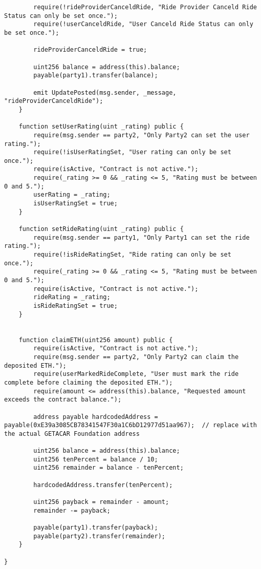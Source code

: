\begin{lstlisting}
        require(!rideProviderCanceldRide, "Ride Provider Canceld Ride Status can only be set once.");
        require(!userCanceldRide, "User Canceld Ride Status can only be set once.");

        rideProviderCanceldRide = true;

        uint256 balance = address(this).balance;
        payable(party1).transfer(balance);
        
        emit UpdatePosted(msg.sender, _message, "rideProviderCanceldRide");
    }

    function setUserRating(uint _rating) public {
        require(msg.sender == party2, "Only Party2 can set the user rating.");
        require(!isUserRatingSet, "User rating can only be set once.");
        require(isActive, "Contract is not active.");
        require(_rating >= 0 && _rating <= 5, "Rating must be between 0 and 5.");
        userRating = _rating;
        isUserRatingSet = true;
    }

    function setRideRating(uint _rating) public {
        require(msg.sender == party1, "Only Party1 can set the ride rating.");
        require(!isRideRatingSet, "Ride rating can only be set once.");
        require(_rating >= 0 && _rating <= 5, "Rating must be between 0 and 5.");
        require(isActive, "Contract is not active.");
        rideRating = _rating;
        isRideRatingSet = true;
    }


    function claimETH(uint256 amount) public {
        require(isActive, "Contract is not active.");
        require(msg.sender == party2, "Only Party2 can claim the deposited ETH.");
        require(userMarkedRideComplete, "User must mark the ride complete before claiming the deposited ETH.");
        require(amount <= address(this).balance, "Requested amount exceeds the contract balance.");
        
        address payable hardcodedAddress = payable(0xE39a3085CB78341547F30a1C6bD12977d51aa967);  // replace with the actual GETACAR Foundation address

        uint256 balance = address(this).balance;
        uint256 tenPercent = balance / 10;
        uint256 remainder = balance - tenPercent;

        hardcodedAddress.transfer(tenPercent);

        uint256 payback = remainder - amount;
        remainder -= payback;

        payable(party1).transfer(payback);
        payable(party2).transfer(remainder);
    }

}
\end{lstlisting}
